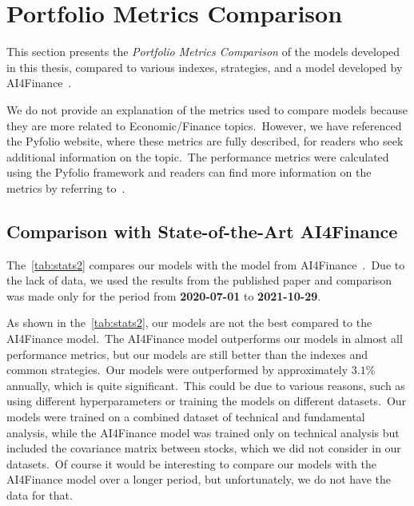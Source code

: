 \documentclass[../xlapes02]{subfiles}
\begin{document}
    \section{Portfolio Metrics Comparison}\label{sec:portfolio-metrics-comparison}
    This section presents the \emph{Portfolio Metrics Comparison} of the models developed in this thesis, compared to various indexes, strategies, and a model developed by AI4Finance~\cite{finrl-portfolio-allocation-2020}.

    We do not provide an explanation of the metrics used to compare models because they are more related to Economic/Finance topics.\ However, we have referenced the Pyfolio website, where these metrics are fully described, for readers who seek additional information on the topic.\ The performance metrics were calculated using the Pyfolio framework and readers can find more information on the metrics by referring to~\cite{Pyfolio, Pyfolio-return-analysis}.

    \subsection{Comparison with State-of-the-Art AI4Finance}\label{subsec:ai4finance-model}
    The~\cref{tab:stats2} compares our models with the model from AI4Finance~\cite{finrl-portfolio-allocation-2020}.\ Due to the lack of data, we used the results from the published paper and comparison was made only for the period from \textbf{2020-07-01} to \textbf{2021-10-29}.

    As shown in the~\cref{tab:stats2}, our models are not the best compared to the AI4Finance model.\ The AI4Finance model outperforms our models in almost all performance metrics, but our models are still better than the indexes and common strategies.\ Our models were outperformed by approximately $3.1\%$ annually, which is quite significant.\ This could be due to various reasons, such as using different hyperparameters or training the models on different datasets.\ Our models were trained on a combined dataset of technical and fundamental analysis, while the AI4Finance model was trained only on technical analysis but included the covariance matrix between stocks, which we did not consider in our datasets.\ Of course it would be interesting to compare our models with the AI4Finance model over a longer period, but unfortunately, we do not have the data for that.
\end{document}
